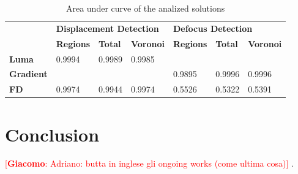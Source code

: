 \documentclass{llncs}
\newcommand{\gi}[1]{{\textcolor{red}{[\small \textbf{Giacomo}: #1]}}}
\begin{document}
\begin{table}[tbh]
\centering
\begin{tabular}{l|l|l|l|l|l|l|}
\cline{2-7}
& \multicolumn{3}{l|}{\cellcolor[HTML]{C0C0C0}\textbf{Displacement Detection}}  & \multicolumn{3}{l|}{\cellcolor[HTML]{C0C0C0}\textbf{Defocus Detection}} \\ \cline{2-7} 
& \cellcolor[HTML]{EFEFEF}\textbf{Regions} & \cellcolor[HTML]{EFEFEF}\textbf{Total} & \cellcolor[HTML]{EFEFEF}\textbf{Voronoi} & \cellcolor[HTML]{EFEFEF}\textbf{Regions} & \cellcolor[HTML]{EFEFEF}\textbf{Total} & \cellcolor[HTML]{EFEFEF}\textbf{Voronoi} \\ \hline
\multicolumn{1}{|l|}{\cellcolor[HTML]{EFEFEF}\textbf{Luma}}     & 0.9994 & 0.9989 & 0.9985  &            &            &             \\ \hline
\multicolumn{1}{|l|}{\cellcolor[HTML]{EFEFEF}\textbf{Gradient}} &  		 &  		  &             & 0.9895 & 0.9996 & 0.9996  \\ \hline
\multicolumn{1}{|l|}{\cellcolor[HTML]{EFEFEF}\textbf{FD}}         & 0.9974 & 0.9944 & 0.9974  & 0.5526 & 0.5322 & 0.5391  \\ \hline
\end{tabular}
\caption{Area under curve of the analized solutions}
\label{tab:AUC}
\end{table}




\section{Conclusion}\label{sec:Conclusion}
\gi{Adriano: butta in inglese gli ongoing works (come ultima cosa)}
.
\end{document}

